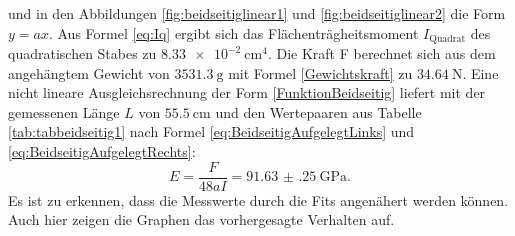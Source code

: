 und in den Abbildungen \ref{fig:beidseitiglinear1} und \ref{fig:beidseitiglinear2} die Form $y=a x$. Aus Formel \eqref{eq:Iq} ergibt sich das Flächenträgheitsmoment $I_\text{Quadrat}$ des quadratischen Stabes zu $\SI{8.33e-2}{\centi\meter\tothe{4}}$.  Die Kraft F berechnet sich aus dem angehängtem Gewicht von $\SI{3531.3}{\gram}$ mit Formel \eqref{Gewichtskraft} zu $\SI{34.64}{\newton}$. Eine nicht lineare Ausgleichsrechnung der Form \eqref{FunktionBeidseitig} liefert mit der gemessenen Länge $L$ von $\SI{55.5}{\centi\meter}$ und den Wertepaaren aus Tabelle \ref{tab:tabbeidseitig1} nach Formel \eqref{eq:BeidseitigAufgelegtLinks} und \eqref{eq:BeidseitigAufgelegtRechts}:
\begin{displaymath}
E = \frac{F}{48 a I}= \SI{91.63(25)}{\giga\pascal}\text{.}
\end{displaymath}
Es ist zu erkennen, dass die Messwerte durch die Fits angenähert werden können. Auch hier zeigen die Graphen das vorhergesagte Verhalten auf.
